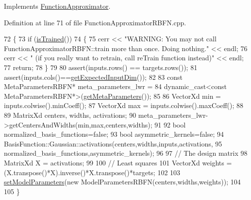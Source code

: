 Implements \hyperlink{classDmpBbo_1_1FunctionApproximator_a9781476c7d296da4aaf50e74cd273a75}{Function\+Approximator}.



Definition at line 71 of file Function\+Approximator\+R\+B\+F\+N.\+cpp.


\begin{DoxyCode}
72 \{
73   \textcolor{keywordflow}{if} (\hyperlink{classDmpBbo_1_1FunctionApproximator_a178135f623d9b9058870851a53299c6e}{isTrained}())  
74   \{
75     cerr << \textcolor{stringliteral}{"WARNING: You may not call FunctionApproximatorRBFN::train more than once. Doing nothing."} << 
      endl;
76     cerr << \textcolor{stringliteral}{"   (if you really want to retrain, call reTrain function instead)"} << endl;
77     \textcolor{keywordflow}{return};
78   \}
79   
80   assert(inputs.rows() == targets.rows());
81   assert(inputs.cols()==\hyperlink{classDmpBbo_1_1FunctionApproximator_af5a550bcf65d5a29a153a594cc4e3fa1}{getExpectedInputDim}());
82 
83   \textcolor{keyword}{const} MetaParametersRBFN* meta\_parameters\_lwr = 
84     \textcolor{keyword}{dynamic\_cast<}\textcolor{keyword}{const }MetaParametersRBFN*\textcolor{keyword}{>}(\hyperlink{classDmpBbo_1_1FunctionApproximator_a6f1a44062eac61d88b647c358bcda155}{getMetaParameters}());
85   
86   VectorXd min = inputs.colwise().minCoeff();
87   VectorXd max = inputs.colwise().maxCoeff();
88   
89   MatrixXd centers, widths, activations;
90   meta\_parameters\_lwr->getCentersAndWidths(min,max,centers,widths);
91 
92   \textcolor{keywordtype}{bool} normalized\_basis\_functions=\textcolor{keyword}{false};  
93   \textcolor{keywordtype}{bool} asymmetric\_kernels=\textcolor{keyword}{false};  
94   BasisFunction::Gaussian::activations(centers,widths,inputs,activations,
95     normalized\_basis\_functions,asymmetric\_kernels);
96   
97   \textcolor{comment}{// The design matrix}
98   MatrixXd X = activations;
99 
100   \textcolor{comment}{// Least squares}
101   VectorXd weights = (X.transpose()*X).inverse()*X.transpose()*targets;
102 
103   \hyperlink{classDmpBbo_1_1FunctionApproximator_afd6f9d480456b90c4740c7aaca084ba4}{setModelParameters}(\textcolor{keyword}{new} ModelParametersRBFN(centers,widths,weights));
104   
105 \}
\end{DoxyCode}


